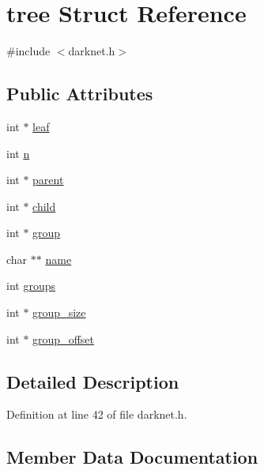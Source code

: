 \hypertarget{structtree}{}\section{tree Struct Reference}
\label{structtree}


{\ttfamily \#include $<$darknet.\+h$>$}

\subsection*{Public Attributes}
\begin{DoxyCompactItemize}
\item 
int $\ast$ \mbox{\hyperlink{structtree_a08371bc037edecea4f1632c2185b1ff1}{leaf}}
\item 
int \mbox{\hyperlink{structtree_a2273fc7497601bfaf9121d1a797453b5}{n}}
\item 
int $\ast$ \mbox{\hyperlink{structtree_a77b1eb5cb07b504420034ed006f75cb5}{parent}}
\item 
int $\ast$ \mbox{\hyperlink{structtree_ac33525f8c2ea9df09aa39e4e5f0f46b0}{child}}
\item 
int $\ast$ \mbox{\hyperlink{structtree_a3accabb15b1b96d0f81e40341e55cc20}{group}}
\item 
char $\ast$$\ast$ \mbox{\hyperlink{structtree_aef62d17752842a143625d7313073c068}{name}}
\item 
int \mbox{\hyperlink{structtree_ab4d92fc866330ea5e427d6b5b8075604}{groups}}
\item 
int $\ast$ \mbox{\hyperlink{structtree_a4b84be443f42bcf6cc16fd9d3fa1f326}{group\+\_\+size}}
\item 
int $\ast$ \mbox{\hyperlink{structtree_a349dec53fea0efa2e19de49785a2f0ff}{group\+\_\+offset}}
\end{DoxyCompactItemize}


\subsection{Detailed Description}


Definition at line 42 of file darknet.\+h.



\subsection{Member Data Documentation}
\mbox{\label{structtree_ac33525f8c2ea9df09aa39e4e5f0f46b0}} 
